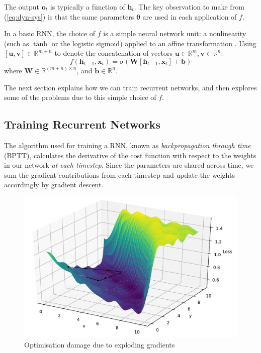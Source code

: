 \documentclass[12pt,a4paper,twoside,openright]{report}
\newcommand{\vect}[1]{\boldsymbol{\mathbf{#1}}}
\begin{document}
The output $\vect{o}_t$ is typically a function of $\vect{h}_t$. The key
observation to make from (\ref{eq:dyn-sys}) is that the same parameters
$\vect{\theta}$ are used in each application of $f$. 

In a basic RNN, the choice of $f$ is a simple neural network unit: a
nonlinearity (such as $\tanh$ or the logistic sigmoid) applied to an affine
transformation \cite{zaremba2014recurrent}. Using
$[\vect{u},\vect{v}] \in \mathbb{R}^{m+n}$ to denote the concatenation of
vectors $\vect{u} \in \mathbb{R}^m, \vect{v} \in \mathbb{R}^n$: 
$$f(\vect{h}_{t-1}, \vect{x}_t) = \sigma(\vect{W}[\vect{h}_{t-1}, 
\vect{x}_t] + \vect{b})$$ 
where $\vect{W} \in \mathbb{R}^{(m+n) \times n}$, and $\vect{b} \in
\mathbb{R}^n$. 

The next section explains how we can train recurrent networks, and then explores
some of the problems due to this simple choice of $f$.

\subsection{Training Recurrent Networks}\label{sec:rnn-train}

The algorithm used for training a RNN, known as \emph{backpropagation through
time} (BPTT), calculates the derivative of the cost function with respect to the
weights in our network \emph{at each timestep}. Since the parameters are shared
across time, we sum the gradient contributions from each timestep and update the
weights accordingly by gradient descent.

\begin{figure}[H]
\centering
\includegraphics[width=400pt]{figs/exploding_gradients.pdf}
\caption{Optimisation damage due to exploding gradients}
\label{fig:exploding-grad}
\end{figure}
\end{document}
